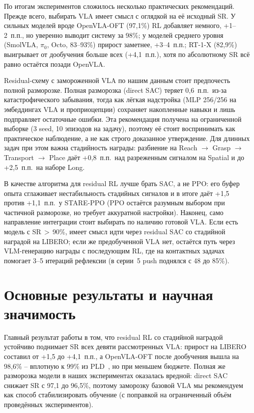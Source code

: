     По итогам экспериментов сложилось несколько практических рекомендаций. Прежде всего, выбирать VLA имеет смысл с оглядкой на её исходный SR. У сильных моделей вроде OpenVLA-OFT (97,1\%) RL добавляет немного, +1--2~п.п., но уверенно выводит систему за 98\%; у моделей среднего уровня (SmolVLA, $\pi_0$, Octo, 83--93\%) прирост заметнее, +3--4~п.п.; RT-1-X (82,9\%) выигрывает от дообучения больше всех (+4,1~п.п.), хотя по абсолютному SR всё равно остаётся позади OpenVLA.

    Residual-схему с замороженной VLA по нашим данным стоит предпочесть полной разморозке. Полная разморозка (direct SAC) теряет 0,6~п.п.\ из-за катастрофического забывания, тогда как лёгкая надстройка (MLP 256/256 на эмбеддингах VLA и проприоцепции) сохраняет накопленные навыки и лишь подправляет остаточные ошибки. Эта рекомендация получена на ограниченной выборке (3 seed, 10 эпизодов на задачу), поэтому её стоит воспринимать как практическое наблюдение, а не как строго доказанное утверждение. Для длинных задач при этом важна стадийность награды: разбиение на Reach $\to$ Grasp $\to$ Transport $\to$ Place даёт +0,8~п.п.\ над разреженным сигналом на Spatial и до +2,5~п.п.\ на наборе Long.

    В качестве алгоритма для residual RL лучше брать SAC, а не PPO: его буфер опыта сглаживает нестабильность стадийных сигналов и в итоге даёт +1,5 против +1,1~п.п.\ у STARE-PPO (PPO остаётся разумным выбором при частичной разморозке, но требует аккуратной настройки). Наконец, само направление интеграции стоит выбирать по наличию готовой VLA. Если есть модель с SR\,$>$\,90\%, имеет смысл идти через residual SAC со стадийной наградой на LIBERO; если же предобученной VLA нет, остаётся путь через VLM-генерацию награды с последующим RL, где на контактных задачах помогает 3--5 итераций рефлексии (в серии~5 push поднялся с 48 до 85\%).

\section*{Основные результаты и научная значимость}

    Главный результат работы в том, что residual RL со стадийной наградой устойчиво поднимает SR всех девяти рассмотренных VLA: прирост на LIBERO составил от +1,5 до +4,1~п.п., а OpenVLA-OFT после дообучения вышла на 98,6\% -- вплотную к 99\% из PLD~\cite{pld2026}, но при меньшем бюджете. Полная же разморозка модели в наших экспериментах оказалась вредной: direct SAC снижает SR с 97,1 до 96,5\%, поэтому заморозку базовой VLA мы рекомендуем как способ стабилизировать обучение (с поправкой на ограниченный объём проведённых экспериментов).

